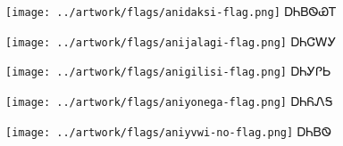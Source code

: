 \documentclass[avery5371,frame]{flashcards}%
\begin{document}

\begin{flashcard}{
\texttt{[image: ../artwork/flags/anidaksi-flag.png]}
}\Huge ᎠᏂᏴᏫᏯᎢ
\end{flashcard}

\begin{flashcard}{
\texttt{[image: ../artwork/flags/anijalagi-flag.png]}
}\Huge ᎠᏂᏣᎳᎩ
\end{flashcard}

\begin{flashcard}{
\texttt{[image: ../artwork/flags/anigilisi-flag.png]}
}\Huge ᎠᏂᎩᎵᏏ
\end{flashcard}

\begin{flashcard}{
\texttt{[image: ../artwork/flags/aniyonega-flag.png]}
}\Huge ᎠᏂᏲᏁᎦ
\end{flashcard}

\begin{flashcard}{
\texttt{[image: ../artwork/flags/aniyvwi-no-flag.png]}
}\Huge ᎠᏂᏴᏫ
\end{flashcard}
\end{document}
